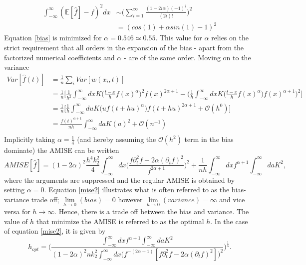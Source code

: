 \begin{equation}
	\begin{split}
		\int_{-\infty}^{\infty}(\mathbb{E}[\hat{f}]-f)^2dx&\sim \bigg(\sum_{i=1}^{\infty}\frac{(1-2i\alpha)(-1)^i}{(2i)!}\bigg)^2\\
		&=(cos(1)+\alpha sin(1)-1)^2
	\end{split}
	\label{bias}
\end{equation}
Equation \eqref{bias} is minimized for $\alpha=0.546\simeq 0.55$. This value for $\alpha$ relies on the strict requirement that all orders in the expansion of the bias - apart from the factorized numerical coefficients and $\alpha$ - are of the same order. Moving on to the variance
\begin{equation}
	\begin{split}
		Var[\hat{f}(t)]&=\frac{1}{n}\sum_iVar[w(x_i,t)]\\
		&=\frac{1}{n}\bigg[\frac{1}{h^2}\int_{-\infty}^{\infty}dx K\bigg(\frac{t-x}{h}f(x)^\alpha\bigg)^2f(x)^{2\alpha+1}-\bigg(\frac{1}{h}\int_{-\infty}^{\infty}dxK\bigg(\frac{t-x}{h}f(x)^\alpha\bigg)f(x)^{\alpha+1}\bigg)^2\bigg]\\
		&=\frac{1}{n}\bigg[\frac{1}{h}\int_{-\infty}^{\infty}du K\big(uf(t+hu)^\alpha\big)f(t+hu)^{2\alpha+1}+\mathcal{O}(h^0)\bigg]\\
		&=\frac{f(t)^{\alpha+1}}{nh}\int_{-\infty}^{\infty}da K(a)^2+\mathcal{O}(n^{-1})\\
	\end{split}
\end{equation}
Implicitly taking $\alpha=\frac{1}{4}$ (and hereby assuming the $\mathcal{O}(h^2)$ term in the bias dominate) the AMISE can be written
\begin{equation}
	AMISE[\hat{f}]= (1-2\alpha)^2\frac{h^4k_2^2}{4}\int_{-\infty}^{\infty}dx\bigg(\frac{f\partial_t^2f-2\alpha(\partial_tf)^2}{f^{2\alpha+1}}\bigg)^2+\frac{1}{nh}\int_{-\infty}^{\infty}dxf^{\alpha+1}\int_{-\infty}^{\infty}da K^2,
	\label{mise2}
\end{equation}
where the arguments are suppressed and the regular AMISE is obtained by setting $\alpha=0$. Equation \eqref{mise2} illustrates what is often referred to as the bias-variance trade off; $\lim\limits_{h\rightarrow 0}(bias)=0$ however $\lim\limits_{h\rightarrow 0}(variance)=\infty$ and vice versa for $h\rightarrow \infty$. Hence, there is a trade off between the bias and variance. The value of $h$ that minimize the AMISE is referred to as the optimal $h$. In the case of equation \eqref{mise2}, it is given by
\begin{equation}
	h_{opt}= \bigg(\frac{\int_{-\infty}^{\infty}dxf^{\alpha+1}\int_{-\infty}^{\infty}da K^2}{(1-2\alpha)^2nk_2^2\int_{-\infty}^{\infty}dx\big(f^{-(2\alpha+1)}[f\partial_t^2f-2\alpha(\partial_tf)^2]\big)^2}\bigg)^\frac{1}{5}.
	\label{h3}
\end{equation}

